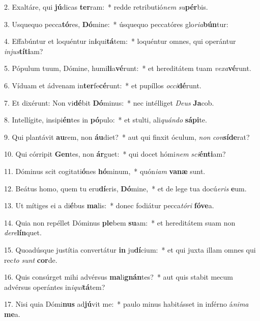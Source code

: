 2. Exaltáre, qui \textbf{jú}dicas \textbf{ter}ram:~*  redde retributió\textit{nem} \textit{su}\textbf{pér}bis.\

3. Usquequo pecca\textbf{tó}res, \textbf{Dó}mine:~*  úsquequo peccatóres glo\textit{ri}\textit{a}\textbf{bún}tur:\

4. Effabúntur et loquéntur in\textbf{i}qui\textbf{tá}tem:~*  loquéntur omnes, qui operántur \textit{in}\textit{jus}\textbf{tí}\textbf{ti}am?\

5. Pópulum tuum, Dómine, humi\textbf{li}a\textbf{vé}runt:~*  et hereditátem tuam \textit{ve}\textit{xa}\textbf{vé}runt.\

6. Víduam et ádvenam in\textbf{ter}fe\textbf{cé}runt:~*  et pupíllos \textit{oc}\textit{ci}\textbf{dé}runt.\

7. Et dixérunt: Non vi\textbf{dé}bit \textbf{Dó}minus:~*  nec intélliget \textit{De}\textit{us} \textbf{Ja}cob.\

8. Intellígite, insipi\textbf{én}tes in \textbf{pó}pulo:~*  et stulti, ali\textit{quán}\textit{do} \textbf{sá}\textbf{pi}te.\

9. Qui plantávit \textbf{au}rem, non \textbf{áu}diet?~*  aut qui finxit óculum, \textit{non} \textit{con}\textbf{sí}\textbf{de}rat?\

10. Qui córripit \textbf{Gen}tes, non \textbf{ár}guet:~*  qui docet hómi\textit{nem} \textit{sci}\textbf{én}\textbf{ti}am?\

11. Dóminus scit cogitati\textbf{ó}nes \textbf{hó}minum,~*  quón\textit{i}\textit{am} \textbf{va}\textbf{næ} sunt.\

12. Beátus homo, quem tu eru\textbf{dí}eris, \textbf{Dó}mine,~*  et de lege tua docú\textit{e}\textit{ris} \textbf{e}um.\

13. Ut mítiges ei a di\textbf{é}bus \textbf{ma}lis:~*  donec fodiátur pecca\textit{tó}\textit{ri} \textbf{fó}\textbf{ve}a.\

14. Quia non repéllet Dóminus \textbf{ple}bem \textbf{su}am:~*  et hereditátem suam non \textit{de}\textit{re}\textbf{lín}quet.\

15. Quoadúsque justítia convertátur \textbf{in} ju\textbf{dí}cium:~*  et qui juxta illam omnes qui rec\textit{to} \textit{sunt} \textbf{cor}de.\

16. Quis consúrget mihi advérsus \textbf{ma}li\textbf{gnán}tes?~*  aut quis stabit mecum advérsus operántes in\textit{i}\textit{qui}\textbf{tá}tem?\

17. Nisi quia Dómi\textbf{nus} ad\textbf{jú}vit me:~*  paulo minus habitásset in inférno á\textit{ni}\textit{ma} \textbf{me}a.\

